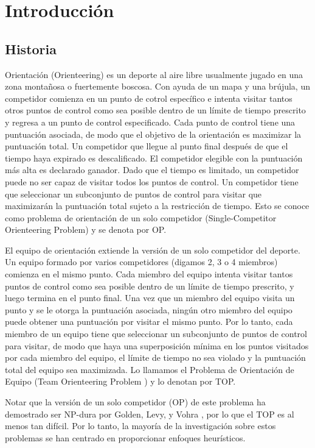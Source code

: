 \chapter{Introducción}

\section{Historia}

Orientación (Orienteering) es un deporte al aire libre usualmente jugado en una zona montañosa o fuertemente boscosa. Con ayuda de un mapa y una brújula, un competidor comienza en un punto de cotrol específico e intenta visitar tantos otros puntos de control como sea posible dentro de un límite de tiempo prescrito y regresa a un punto de control especificado. Cada punto de control tiene una puntuación asociada, de modo que el objetivo de la orientación es maximizar la puntuación total. Un competidor que llegue al punto final después de que el tiempo haya expirado es descalificado. El competidor elegible con la puntuación más alta es declarado ganador. Dado que el tiempo es limitado, un competidor puede no ser capaz de visitar todos los puntos de control. Un competidor tiene que seleccionar un subconjunto de puntos de control para visitar que maximizarán la puntuación total sujeto a la restricción de tiempo. Esto se conoce como problema de orientación de un solo competidor (Single-Competitor Orienteering Problem) y se denota por OP.

\bigskip

El equipo de orientación extiende la versión de un solo competidor del deporte. Un equipo formado por varios competidores (digamos 2, 3 o 4 miembros) comienza en el mismo punto. Cada miembro del equipo intenta visitar tantos puntos de control como sea posible dentro de un límite de tiempo prescrito, y luego termina en el punto final. Una vez que un miembro del equipo visita un punto y se le otorga la puntuación asociada, ningún otro miembro del equipo puede obtener una puntuación por visitar el mismo punto. Por lo tanto, cada miembro de un equipo tiene que seleccionar un subconjunto de puntos de control para visitar, de modo que haya una superposición mínima en los puntos visitados por cada miembro del equipo, el límite de tiempo no sea violado y la puntuación total del equipo sea maximizada. Lo llamamos el Problema de Orientación de Equipo (Team Orienteering Problem ) y lo denotan por TOP.

\bigskip

Notar que la versión de un solo competidor (OP) de este problema ha demostrado ser NP-dura por Golden, Levy, y Vohra \cite{goldenlevyvohra}, por lo que el TOP es al menos tan difícil. Por lo tanto, la mayoría de la investigación sobre estos problemas se han centrado en proporcionar enfoques heurísticos.

